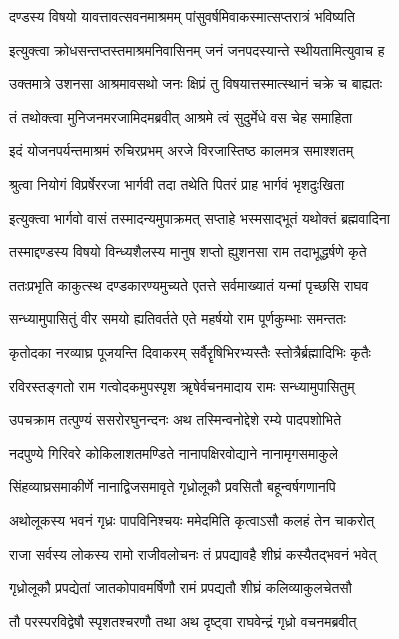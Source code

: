\twolineshloka
{दण्डस्य विषयो यावत्तावत्सवनमाश्रमम्}
{पांसुवर्षमिवाकस्मात्सप्तरात्रं भविष्यति}%

\twolineshloka
{इत्युक्त्वा क्रोधसन्तप्तस्तमाश्रमनिवासिनम्}
{जनं जनपदस्यान्ते स्थीयतामित्युवाच ह}%

\twolineshloka
{उक्तमात्रे उशनसा आश्रमावसथो जनः}
{क्षिप्रं तु विषयात्तस्मात्स्थानं चक्रे च बाह्यतः}%

\twolineshloka
{तं तथोक्त्वा मुनिजनमरजामिदमब्रवीत्}
{आश्रमे त्वं सुदुर्मेधे वस चेह समाहिता}%

\twolineshloka
{इदं योजनपर्यन्तमाश्रमं रुचिरप्रभम्}
{अरजे विरजास्तिष्ठ कालमत्र समाश्शतम्}%

\twolineshloka
{श्रुत्वा नियोगं विप्रर्षेररजा भार्गवी तदा}
{तथेति पितरं प्राह भार्गवं भृशदुःखिता}%

\twolineshloka
{इत्युक्त्वा भार्गवो वासं तस्मादन्यमुपाक्रमत्}
{सप्ताहे भस्मसाद्भूतं यथोक्तं ब्रह्मवादिना}%

\twolineshloka
{तस्माद्दण्डस्य विषयो विन्ध्यशैलस्य मानुष}
{शप्तो ह्युशनसा राम तदाभूद्धर्षणे कृते}%

\twolineshloka
{ततःप्रभृति काकुत्स्थ दण्डकारण्यमुच्यते}
{एतत्ते सर्वमाख्यातं यन्मां पृच्छसि राघव}%

\twolineshloka
{सन्ध्यामुपासितुं वीर समयो ह्यतिवर्तते}
{एते महर्षयो राम पूर्णकुम्भाः समन्ततः}%

\twolineshloka
{कृतोदका नरव्याघ्र पूजयन्ति दिवाकरम्}
{सर्वैरॄषिभिरभ्यस्तैः स्तोत्रैर्ब्रह्मादिभिः कृतैः}%

\twolineshloka
{रविरस्तङ्गतो राम गत्वोदकमुपस्पृश}
{ॠषेर्वचनमादाय रामः सन्ध्यामुपासितुम्}%

\twolineshloka
{उपचक्राम तत्पुण्यं ससरोरघुनन्दनः}
{अथ तस्मिन्वनोद्देशे रम्ये पादपशोभिते}%

\twolineshloka
{नदपुण्ये गिरिवरे कोकिलाशतमण्डिते}
{नानापक्षिरवोद्याने नानामृगसमाकुले}%

\twolineshloka
{सिंहव्याघ्रसमाकीर्णे नानाद्विजसमावृते}
{गृध्रोलूकौ प्रवसितौ बहून्वर्षगणानपि}%

\twolineshloka
{अथोलूकस्य भवनं गृध्रः पापविनिश्चयः}
{ममेदमिति कृत्वाऽसौ कलहं तेन चाकरोत्}%

\twolineshloka
{राजा सर्वस्य लोकस्य रामो राजीवलोचनः}
{तं प्रपद्यावहै शीघ्रं कस्यैतद्भवनं भवेत्}%

\twolineshloka
{गृध्रोलूकौ प्रपद्येतां जातकोपावमर्षिणौ}
{रामं प्रपद्यतौ शीघ्रं कलिव्याकुलचेतसौ}%

\twolineshloka
{तौ परस्परविद्वेषौ स्पृशतश्चरणौ तथा}
{अथ दृष्ट्वा राघवेन्द्रं गृध्रो वचनमब्रवीत्}%

